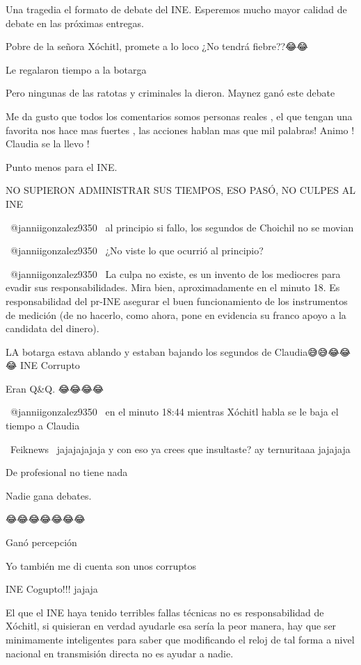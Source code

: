 Una tragedia el formato de debate del INE. Esperemos mucho mayor calidad de debate en las próximas entregas.

Pobre de la señora Xóchitl, promete a lo loco ¿No tendrá fiebre??😂😂

Le regalaron tiempo a la botarga

Pero ningunas de las ratotas y criminales la dieron. Maynez ganó este debate

Me da gusto que todos los comentarios somos personas reales , el que tengan una favorita nos hace mas fuertes , las acciones hablan mas que mil palabras! Animo ! Claudia se la llevo !

Punto menos para el INE.

NO SUPIERON ADMINISTRAR SUS TIEMPOS, ESO PASÓ, NO CULPES AL INE

 @janniigonzalez9350  al principio si fallo, los segundos de Choichil no se movian

 @janniigonzalez9350  ¿No viste lo que ocurrió al principio?

 @janniigonzalez9350     La culpa no existe, es un invento de los mediocres para evadir sus responsabilidades.    Mira bien, aproximadamente en el minuto 18.    Es responsabilidad del pr-INE asegurar el buen funcionamiento de los instrumentos de medición (de no hacerlo, como ahora, pone en evidencia su franco apoyo a la candidata del dinero).

LA botarga estava ablando y estaban bajando los segundos de Claudia😅😅😂😂😂 INE Corrupto

Eran Q&Q. 😂😂😂😂

 @janniigonzalez9350  en el minuto 18:44 mientras Xóchitl habla se le baja el tiempo a Claudia

 Feiknews  jajajajajaja y con eso ya crees que insultaste? ay ternuritaaa jajajaja

De profesional no tiene nada

Nadie gana debates.

😂😂😂😂😂😂😂

Ganó  percepción

Yo también me di cuenta son unos corruptos

INE Cogupto!!! jajaja

El que el INE haya tenido terribles fallas técnicas no es responsabilidad de Xóchitl, si quisieran en verdad ayudarle esa sería la peor manera, hay que ser minimamente inteligentes para saber que modificando el reloj de tal forma a nivel nacional en transmisión directa no es ayudar a nadie.

